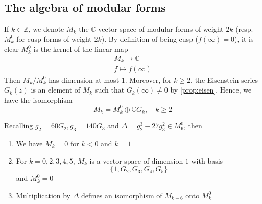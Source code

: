 \documentclass[12pt]{article}
\theoremstyle{definition}
\begin{document}
\subsection{The algebra of modular forms}
If \(k \in \mathbb{Z} \), we denote \(M_k\) the \(\mathbb{C} \)-vector space of modular forms of weight \(2k\) (resp. \(M_k^0\) for cusp forms of weight \(2k\)). By definition of being cusp (\(f(\infty ) = 0\)), it is clear \(M_k^0\) is the kernel of the linear map 
\begin{align*}
M_k \to \mathbb{C} \\
f \mapsto f(\infty )
\end{align*}     
Then \(M_k/M_k^0\) has dimension at most \(1\). Moreover, for \(k\geq 2\), the Eisenstein series \(G_k(z)\) is an element of \(M_k\) such that \(G_k(\infty )\ne 0\) by \cref{prop:eisen}. Hence, we have the isomorphism
\[
    M_k = M_k^0 \oplus \mathbb{C} G_k, \quad k\geq 2
\]    
\begin{thm}[label=33]
    Recalling \(g_2 = 60G_2, g_3 = 140G_3\) and \(\Delta = g_2^3 - 27g_3^2 \in M_6^0\), then
\begin{enumerate}
    \item We have \(M_k=0\) for \(k<0\) and \(k=1\)
    \item For \(k=0,2,3,4,5\), \(M_k\) is a vector space of dimension \(1\) with basis \[\{ 1,G_2,G_3,G_4,G_5 \} \] and \(M_k^0=0\) 
    \item Multiplication by \(\Delta \) defines an isomorphism of \(M_{k-6}\) onto \(M_k^0\)  
\end{enumerate}
\end{thm}
\end{document}
